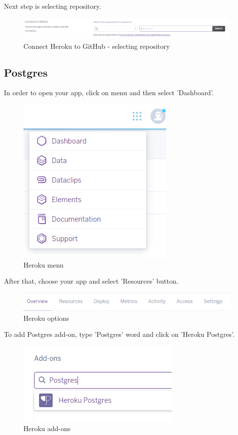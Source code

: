 \documentclass[12pt,a4paper]{article}
\begin{document}
Next step is selecting repository.

\begin{figure}[H]
	\centering
	\includegraphics[width = 1 \textwidth]{images/git2.PNG}
	\caption{Connect Heroku to GitHub - selecting repository}
	\label{fig:git2}
\end{figure}


\subsection{Postgres}
In order to open your app, click on menu and then select 'Dashboard'.\\

\begin{figure}[H]
\centering
\includegraphics{images/dashboard.PNG}
\caption{Heroku menu}
\label{fig:menu}
\end{figure}
After that, choose your app and select 'Resources' button.
\begin{figure}[H]
	\centering
	\includegraphics{images/nav.PNG}
	\caption{Heroku options}
	\label{fig:nav}
\end{figure}


To add Postgres add-on, type 'Postgres' word and click on 'Heroku Postgres'. 
\begin{figure}[H]
	\centering
	\includegraphics{images/addon.PNG}
	\caption{Heroku add-ons}
	\label{fig:addon}
\end{figure}
\end{document}
